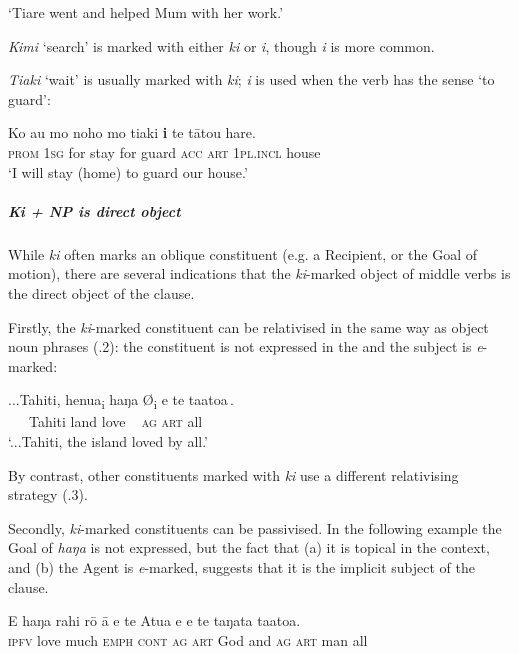 \glt
‘Tiare went and helped Mum with her work.’ \textstyleExampleref{[R334.125]} 
\z

\textit{Kimi} ‘search’ is marked with either \textit{ki} or \textit{i}, though \textit{i} is more common.

\textit{Tiaki} ‘wait’ is usually marked with \textit{ki}; \textit{i} is used when the verb has the sense ‘to guard’:

\ea\label{ex:8.126}
\gll Ko au mo noho mo tiaki \textbf{i} te tātou hare. \\
\textsc{prom} \textsc{1sg} for stay for guard \textsc{acc} \textsc{art} \textsc{1pl.incl} house \\

\glt 
‘I will stay (home) to guard our house.’ \textstyleExampleref{[R399.130]} 
\z

\subparagraph{\textit{Ki} + NP is direct object} While \textit{ki} often marks an oblique constituent (e.g. a Recipient, or the Goal of motion), there are several indications that the \textit{ki}{}-marked object of middle verbs is the direct object of the clause. 

Firstly, the \textit{ki}{}-marked constituent can be relativised in the same way as object noun phrases (.2): the constituent is not expressed in the  and the subject is \textit{e}{}-marked:

\ea\label{ex:8.127}
\gll ...Tahiti, henua\textsubscript{\textup{i}} {\ob}haŋa \textup{Ø\textsubscript{i}} e te ta{\ꞌ}ato{\ꞌ}a\,{\cb}. \\
 ~~~Tahiti land  {\db}love ~ \textsc{ag} \textsc{art} all \\

\glt
‘...Tahiti, the island loved by all.’ \textstyleExampleref{[R303.019]} 
\z

By contrast, other constituents marked with \textit{ki} use a different relativising strategy (.3).

Secondly, \textit{ki}{}-marked constituents can be passivised. In the following example the Goal of \textit{haŋa} is not expressed, but the fact that (a) it is topical in the context, and (b) the Agent is \textit{e}{}-marked, suggests that it is the implicit subject of the clause.

\ea\label{ex:8.128}
\gll E haŋa rahi rō {\ꞌ}ā e te {\ꞌ}Atua {\ꞌ}e e te taŋata ta{\ꞌ}ato{\ꞌ}a. \\
\textsc{ipfv} love much \textsc{emph} \textsc{cont} \textsc{ag} \textsc{art} God and \textsc{ag} \textsc{art} man all \\

